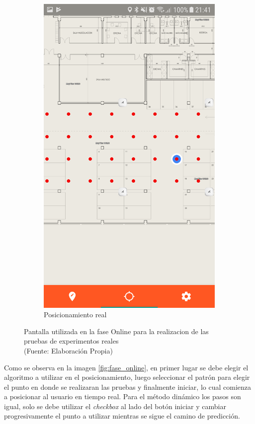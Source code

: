 \begin{figure}[ht!]
\begin{subfigure}{.3\textwidth}
  \includegraphics[width=.8\linewidth]{figures/fase_online3.png}
  \caption{Posicionamiento real}
  \label{fig:online3}
\end{subfigure}
\caption[abs]{Pantalla utilizada en la fase Online para la realizacion de las pruebas de experimentos reales \\
{\scriptsize (Fuente: Elaboración Propia)}}
\label{fig:fase_online}
\end{figure}

Como se observa en la imagen \autoref{fig:fase_online}, en primer lugar se debe elegir el algoritmo a utilizar en el posicionamiento, luego seleccionar el patrón para elegir el punto en donde se realizaran las pruebas y finalmente iniciar, lo cual comienza a posicionar al usuario en tiempo real. Para el método dinámico los pasos son igual, solo se debe utilizar el \textit{checkbox} al lado del botón iniciar y cambiar progresivamente el punto a utilizar mientras se sigue el camino de predicción.

